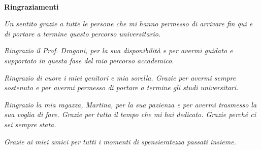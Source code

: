 
\newpage 

\ %

\newpage

\begin{center}
  {\bf \Huge Ringraziamenti}
\end{center}

\vspace{4cm}


\emph{Un sentito grazie a tutte le persone che mi hanno permesso di arrivare fin qui e di portare a termine questo percorso universitario.}

\emph{Ringrazio il Prof. Dragoni, per la sua disponibilità e per avermi guidato e supportato in questa fase del mio percorso accademico.}

\emph{Ringrazio di cuore i miei genitori e mia sorella. Grazie per avermi sempre sostenuto e per avermi permesso di portare a termine gli studi universitari.}

\emph{Ringrazio la mia ragazza, Martina, per la sua pazienza e per avermi trasmesso la sua voglia di fare. Grazie per tutto il tempo che mi hai dedicato. Grazie perché ci sei sempre stata.}

\emph{Grazie ai miei amici per tutti i momenti di spensieratezza passati insieme.}

